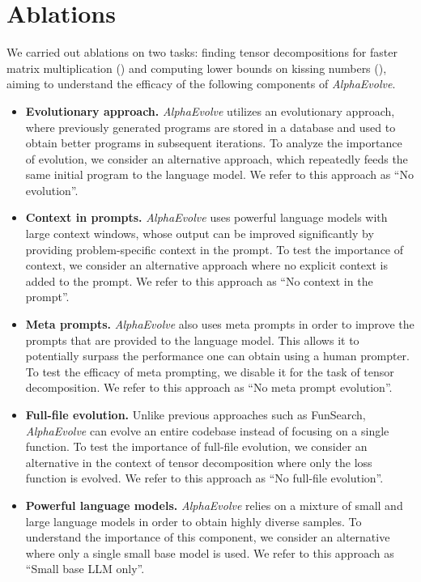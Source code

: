 \documentclass[logo,copyright,12pt]{googledeepmind}
\theoremstyle{definition}
\theoremstyle{remark}
\theoremstyle{plain}
\newcommand{\method}{\emph{AlphaEvolve}\xspace}
\begin{document}



\section{Ablations}
\label{sec:ablations_rewrite}

We carried out ablations on two tasks: finding tensor decompositions for faster matrix multiplication () and computing lower bounds on kissing numbers (), aiming to understand the efficacy of the following components of \method.

\begin{itemize}
    \item {\bf Evolutionary approach.} \method utilizes an evolutionary approach, where previously generated programs are stored in a database and used to obtain better programs in subsequent iterations. To analyze the importance of evolution, we consider an alternative approach, which repeatedly feeds the same initial program to the language model. We refer to this approach as ``No evolution''.
    \item {\bf Context in prompts.} \method uses powerful language models with large context windows, whose output can be improved significantly by providing problem-specific context in the prompt. To test the importance of context, we consider an alternative approach where no explicit context is added to the prompt. We refer to this approach as ``No context in the prompt''.
    \item {\bf Meta prompts.} \method also uses meta prompts in order to improve the prompts that are provided to the language model. This allows it to potentially surpass the performance one can obtain using a human prompter. To test the efficacy of meta prompting, we disable it for the task of tensor decomposition. We refer to this approach as ``No meta prompt evolution''.
    \item {\bf Full-file evolution.} Unlike previous approaches such as FunSearch, \method can evolve an entire codebase instead of focusing on a single function. To test the importance of full-file evolution, we consider an alternative in the context of tensor decomposition where only the loss function is evolved. We refer to this approach as ``No full-file evolution''.
    \item {\bf Powerful language models.} \method relies on a mixture of small and large language models in order to obtain highly diverse samples. To understand the importance of this component, we consider an alternative where only a single small base model is used. We refer to this approach as ``Small base LLM only''.
\end{itemize}
\end{document}

